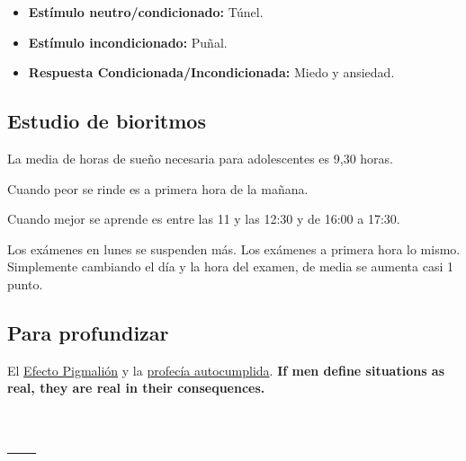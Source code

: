\documentclass[palatino,nochap]{apuntesURJC}
\begin{document}
\begin{itemize}
\item \textbf{Estímulo neutro/condicionado:} Túnel.
\item \textbf{Estímulo incondicionado:} Puñal.
\item \textbf{Respuesta Condicionada/Incondicionada:} Miedo y ansiedad.
\end{itemize}

\section{Estudio de bioritmos}

La media de horas de sueño necesaria para adolescentes es 9,30 horas.

Cuando peor se rinde es a primera hora de la mañana.

Cuando mejor se aprende es entre las 11 y las 12:30 y de 16:00 a 17:30.

Los exámenes en lunes se suspenden más. Los exámenes a primera hora lo mismo.
Simplemente cambiando el día y la hora del examen, de media se aumenta casi 1 punto.

\section{Para profundizar}


El \href{https://es.wikipedia.org/wiki/Efecto\_Pigmali\%C3\%B3n}{Efecto Pigmalión} y la \href{https://es.wikipedia.org/wiki/Profec\%C3\%ADa\_autocumplida}{profecía autocumplida}. 
%
\textbf{If men define situations as real, they are real in their consequences.} 





\appendix

\chapter{---}


\printindex
\end{document}
